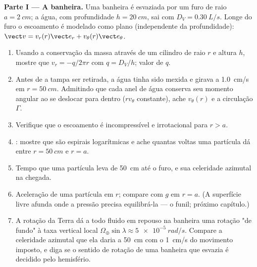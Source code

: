 \begin{problem}
\label{pb:b2:fluid-kinematics:1}

\medskip
\noindent\textbf{Parte I --- A banheira.}
Uma banheira é esvaziada por um furo de raio $a = \qty{2}{cm}$; a água,
com profundidade $h = \qty{20}{cm}$, sai com  $D_V =
\qty{0.30}{L/s}$. Longe do furo o escoamento é modelado como plano
(independente da profundidade): $\vect v = v_r(r)\vect e_r + v_\theta(r)\vect e_\theta$.
\begin{enumerate}
  \item Usando a conservação da massa através de um cilindro de raio $r$ e
        altura $h$, mostre que $v_r = -q/2\pi r$ com $q = D_V/h$;
        valor de $q$.
  \item Antes de a tampa ser retirada, a água tinha sido mexida e
        girava a \qty{1.0}{cm/s} em $r = \qty{50}{cm}$. Admitindo que
        cada anel de água conserva seu momento angular ao se deslocar
        para dentro ($rv_\theta$ constante), ache $v_\theta(r)$ e a
        circulação $\Gamma$.
  \item Verifique que o escoamento é incompressível e irrotacional para
        $r > a$.
  \item {}: mostre que são espirais logarítmicas e ache
        quantas voltas uma partícula dá entre $r = \qty{50}{cm}$ e
        $r = a$.
  \item Tempo que uma partícula leva de \qty{50}{cm} até o furo, e
        sua celeridade azimutal na chegada.
  \item Aceleração de uma partícula em $r$; compare com $g$ em $r = a$.
        (A superfície livre afunda onde a pressão precisa equilibrá-la ---
        o funil; próximo capítulo.)
  \item A rotação da Terra dá a todo fluido em repouso na banheira uma
        rotação "de fundo" à taxa vertical local
        $\Omega_\oplus\sin\lambda \approx \qty{5e-5}{rad/s}$. Compare a
        celeridade azimutal que ela daria a \qty{50}{cm} com o
        \qty{1}{cm/s} do movimento imposto, e diga se o sentido de
        rotação de uma banheira que esvazia é decidido pelo hemisfério.
\end{enumerate}


\end{problem}
